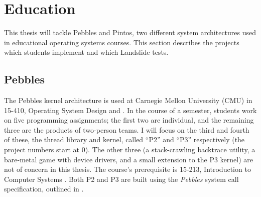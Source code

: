 \section{Education}
\label{sec:overview-edu}

This thesis will tackle Pebbles and Pintos, two different system architectures used in educational operating systems courses.
This section describes the projects which students implement and which Landslide tests.

\subsection{Pebbles}
\label{sec:pebbles}

The Pebbles kernel architecture
is used at Carnegie Mellon University (CMU) in 15-410, Operating System Design and  \cite{kspec,thrlib}.
In the course of a semester, students work on five programming assignments;
the first two are individual, and the remaining three are the products of two-person teams.
I will focus on the third and fourth of these, the thread library and kernel,
called ``P2'' and ``P3'' respectively (the project numbers start at 0).
The other three (a stack-crawling backtrace utility, a bare-metal game with device drivers, and a small extension to the P3 kernel) are not of concern in this thesis.
The course's prerequisite is 15-213, Introduction to Computer Systems \cite{csapp,sigcse01:CSaPP}.
Both P2 and P3 are built using the {\em Pebbles} system call specification, outlined in .

